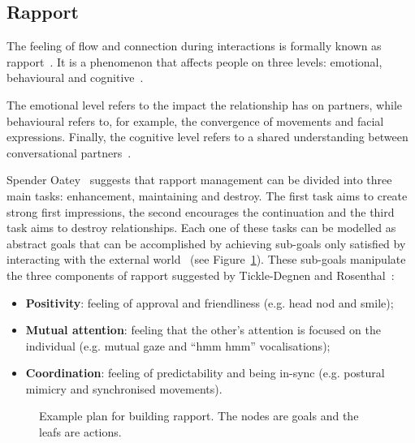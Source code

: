 \subsection{Rapport}
\label{subsec:Rapport}
The feeling of flow and connection during interactions is formally known as rapport~\cite{Wang2009}. It is a phenomenon that affects people on three levels: emotional, behavioural and cognitive~\cite{Wang2009}.

The emotional level refers to the impact the relationship has on partners, while behavioural refers to, for example, the convergence of movements and facial expressions. Finally, the cognitive level refers to a shared understanding between conversational partners~\cite{Wang2009}.

Spender Oatey~\cite{Spencer-Oatey2005} suggests that rapport management can be divided into three main tasks: enhancement, maintaining and destroy. The first task aims to create strong first impressions, the second encourages the continuation and the third task aims to destroy relationships. Each one of these tasks can be modelled as abstract goals that can be accomplished by achieving sub-goals only satisfied by interacting with the external world~\cite{Papangelis2014, Zhao2014} (see Figure~\ref{table:BuildingRapportPlan}). These sub-goals manipulate the three components of rapport suggested by Tickle-Degnen and Rosenthal~\cite{Tickle-Degnen1990}:

\begin{itemize}
	\item \textbf{Positivity}: feeling of approval and friendliness (e.g. head nod and smile);
	\item \textbf{Mutual attention}: feeling that the other's attention is focused on the individual (e.g. mutual gaze and ``hmm hmm'' vocalisations);
	\item \textbf{Coordination}: feeling of predictability and being in-sync (e.g. postural mimicry and synchronised movements).
\end{itemize}

\vspace{-5mm}
\begin{figure}
	\centering
	\caption{Example plan for building rapport. The nodes are goals and the leafs are actions.}
	\label{table:BuildingRapportPlan}
\end{figure}
\vspace{-4mm}

